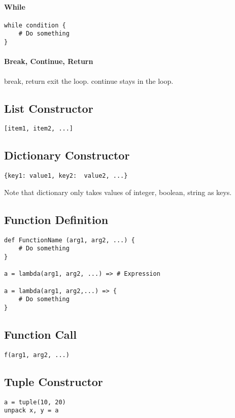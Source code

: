 \documentclass[]{article}
\begin{document}
\paragraph{While}
\begin{lstlisting}
while condition {
	# Do something
}
\end{lstlisting}

\paragraph{Break, Continue, Return}
break, return exit the loop. continue stays in the loop.

\subsection{List Constructor}
\begin{lstlisting}
[item1, item2, ...]
\end{lstlisting}


\subsection{Dictionary Constructor}
\begin{lstlisting}
{key1: value1, key2:  value2, ...}
\end{lstlisting}
Note that dictionary only takes values of integer, boolean, string as keys.

\subsection{Function Definition}
\begin{lstlisting}
def FunctionName (arg1, arg2, ...) {
	# Do something	
}

a = lambda(arg1, arg2, ...) => # Expression

a = lambda(arg1, arg2,...) => {
	# Do something
}
\end{lstlisting}
\subsection{Function Call}
\begin{lstlisting}
f(arg1, arg2, ...)
\end{lstlisting}

\subsection{Tuple Constructor}
\begin{lstlisting}
a = tuple(10, 20)
unpack x, y = a
\end{lstlisting}
\end{document}
